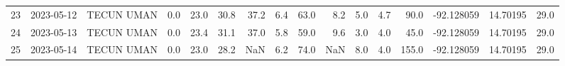 \documentclass[12pt]{article}
\begin{document}
\begin{center}
\begin{tabular}{lllrrrrrrrrrrrrr}
23  & 2023-05-12 &  TECUN UMAN &     0.0 &  23.0 &   30.8 &  37.2 &      6.4 &     63.0 &        8.2 &  5.0 &         4.7 &        90.0 & -92.128059 &  14.70195 &     29.0 \\
24  & 2023-05-13 &  TECUN UMAN &     0.0 &  23.4 &   31.1 &  37.0 &      5.8 &     59.0 &        9.6 &  3.0 &         4.0 &        45.0 & -92.128059 &  14.70195 &     29.0 \\
25  & 2023-05-14 &  TECUN UMAN &     0.0 &  23.0 &   28.2 &   NaN &      6.2 &     74.0 &        NaN &  8.0 &         4.0 &       155.0 & -92.128059 &  14.70195 &     29.0 \\
\bottomrule
\end{tabular}

        
        \end{center}
        
\end{document}
